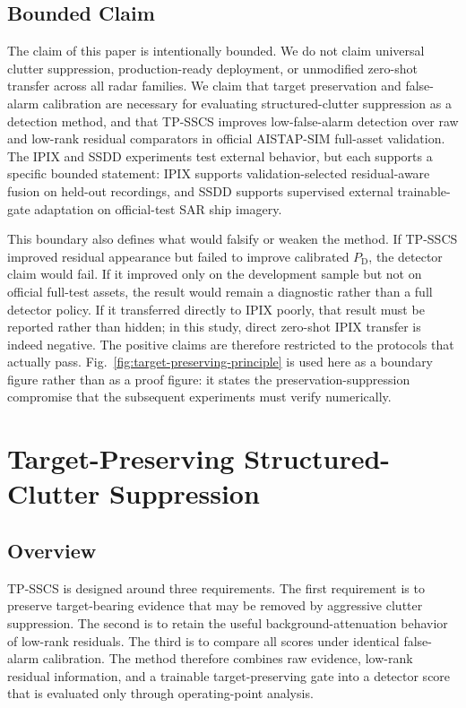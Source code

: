 \documentclass[journal]{IEEEtran}
\begin{document}
\subsection{Bounded Claim}

The claim of this paper is intentionally bounded. We do not claim universal clutter suppression, production-ready deployment, or unmodified zero-shot transfer across all radar families. We claim that target preservation and false-alarm calibration are necessary for evaluating structured-clutter suppression as a detection method, and that TP-SSCS improves low-false-alarm detection over raw and low-rank residual comparators in official AISTAP-SIM full-asset validation. The IPIX and SSDD experiments test external behavior, but each supports a specific bounded statement: IPIX supports validation-selected residual-aware fusion on held-out recordings, and SSDD supports supervised external trainable-gate adaptation on official-test SAR ship imagery.

This boundary also defines what would falsify or weaken the method. If TP-SSCS improved residual appearance but failed to improve calibrated $P_{\mathrm{D}}$, the detector claim would fail. If it improved only on the development sample but not on official full-test assets, the result would remain a diagnostic rather than a full detector policy. If it transferred directly to IPIX poorly, that result must be reported rather than hidden; in this study, direct zero-shot IPIX transfer is indeed negative. The positive claims are therefore restricted to the protocols that actually pass. Fig.~\ref{fig:target-preserving-principle} is used here as a boundary figure rather than as a proof figure: it states the preservation-suppression compromise that the subsequent experiments must verify numerically.

\section{Target-Preserving Structured-Clutter Suppression}

\subsection{Overview}

TP-SSCS is designed around three requirements. The first requirement is to preserve target-bearing evidence that may be removed by aggressive clutter suppression. The second is to retain the useful background-attenuation behavior of low-rank residuals. The third is to compare all scores under identical false-alarm calibration. The method therefore combines raw evidence, low-rank residual information, and a trainable target-preserving gate into a detector score that is evaluated only through operating-point analysis.
\end{document}
